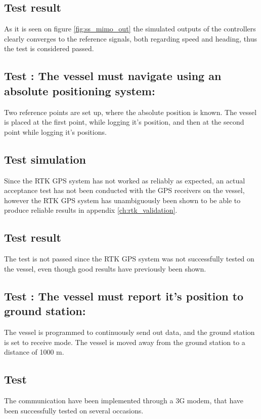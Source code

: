 \subsection{Test result}
As it is seen on figure \vref{fig:ss_mimo_out} the simulated outputs of the controllers clearly converges to the reference signals, both regarding speed and heading, thus the test is considered passed.


\subsection*{Test : The vessel must navigate using an absolute positioning system:}
Two reference points are set up, where the absolute position is known. The vessel is placed at the first point, while logging it's position, and then at the second point while logging it's positions.

\subsection{Test simulation}
Since the \ac{RTK} \ac{GPS} system has not worked as reliably as expected, an actual acceptance test has not been conducted with the \ac{GPS} receivers on the vessel, however the \ac{RTK} \ac{GPS} system has unambiguously been shown to be able to produce reliable results in appendix \vref{ch:rtk_validation}.

\subsection{Test result}
The test is not passed since the \ac{RTK} \ac{GPS} system was not successfully tested on the vessel, even though good results have previously been shown.

\subsection*{Test : The vessel must report it's position to ground station:}
The vessel is programmed to continuously send out data, and the ground station is set to receive mode. The vessel is moved away from the ground station to a distance of 1000 m.

\subsection{Test}
The communication have been implemented through a 3G modem, that have been successfully tested on several occasions.

